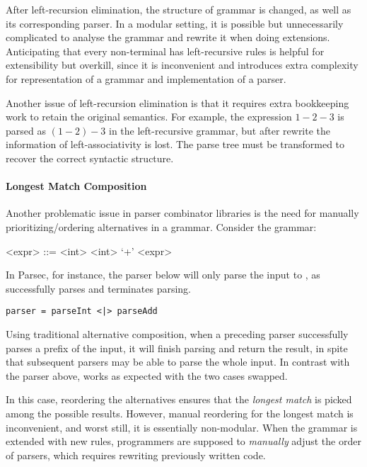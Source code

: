 After left-recursion elimination, the structure of grammar is changed,
as well as its corresponding parser. In a modular setting, it is
possible but unnecessarily complicated to analyse the grammar and
rewrite it when doing extensions. Anticipating that every non-terminal
has left-recursive rules is helpful for extensibility but overkill,
since it is inconvenient and introduces extra complexity for
representation of a grammar and implementation of a parser.

Another issue of left-recursion elimination is that it requires extra
bookkeeping work to retain the original semantics. For example, the
expression $1-2-3$ is parsed as $(1-2)-3$ in the left-recursive
grammar, but after rewrite the information of left-associativity is lost. The parse tree
must be transformed to recover the correct syntactic structure.

\paragraph{Longest Match Composition} Another problematic issue
in parser combinator libraries is the need for manually prioritizing/ordering
alternatives in a grammar.
Consider the grammar:
\setlength{\grammarindent}{5em}
\begin{grammar}
<expr> ::= <int> \alt <int> `+' <expr>
\end{grammar}

In Parsec, for instance, the parser below will only parse the input  to , as  successfully parses 
and terminates parsing.

\begin{lstlisting}[language=PlainCode]
parser = parseInt <|> parseAdd
\end{lstlisting}

Using traditional alternative composition, when a preceding parser successfully parses a prefix of the input, it will finish parsing and return the result, in spite that subsequent parsers may be able to parse the whole input. In contrast with the parser above,  works as expected with the two cases swapped.

In this case, reordering the alternatives ensures that
the \emph{longest match} is picked among the possible results. However, manual reordering for the longest match is inconvenient, and worst still, it is essentially non-modular. When the grammar is extended with new rules, programmers are supposed to \emph{manually} adjust
the order of parsers, which requires rewriting previously written code.

